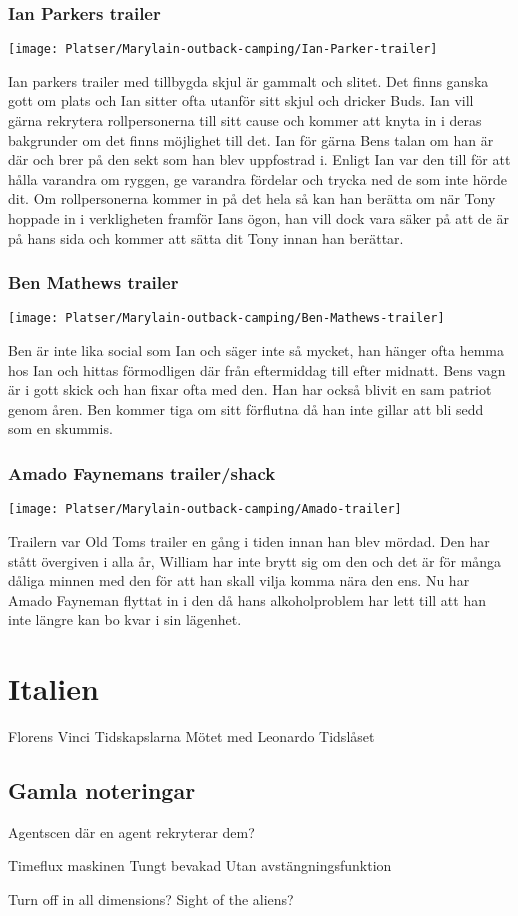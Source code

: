 \documentclass[a5paper,10pt]{report}
\begin{document}
\subsection{Ian Parkers trailer}
\texttt{[image: Platser/Marylain-outback-camping/Ian-Parker-trailer]}

Ian parkers trailer med tillbygda skjul är gammalt och slitet. Det finns ganska gott om plats och Ian sitter ofta utanför sitt skjul och dricker Buds. Ian vill gärna rekrytera rollpersonerna till sitt cause och kommer att knyta in i deras bakgrunder om det finns möjlighet till det. Ian för gärna Bens talan om han är där och brer på den sekt som han blev uppfostrad i. Enligt Ian var den till för att hålla varandra om ryggen, ge varandra fördelar och trycka ned de som inte hörde dit. Om rollpersonerna kommer in på det hela så kan han berätta om när Tony hoppade in i verkligheten framför Ians ögon, han vill dock vara säker på att de är på hans sida och kommer att sätta dit Tony innan han berättar.
\clearpage
\subsection{Ben Mathews trailer}
\texttt{[image: Platser/Marylain-outback-camping/Ben-Mathews-trailer]}

Ben är inte lika social som Ian och säger inte så mycket, han hänger ofta hemma hos Ian och hittas förmodligen där från eftermiddag till efter midnatt. Bens vagn är i gott skick och han fixar ofta med den. Han har också blivit en sam patriot genom åren. Ben kommer tiga om sitt förflutna då han inte gillar att bli sedd som en skummis.
\clearpage
\subsection{Amado Faynemans trailer/shack}
\texttt{[image: Platser/Marylain-outback-camping/Amado-trailer]}

Trailern var Old Toms trailer en gång i tiden innan han blev mördad. Den har stått övergiven i alla år, William har inte brytt sig om den och det är för många dåliga minnen med den för att han skall vilja komma nära den ens. Nu har Amado Fayneman flyttat in i den då hans alkoholproblem har lett till att han inte längre kan bo kvar i sin lägenhet.
\chapter{Italien}
Florens
Vinci
Tidskapslarna
Mötet med Leonardo
Tidslåset
\clearpage
\section{Gamla noteringar}

Agentscen där en agent rekryterar dem?

Timeflux maskinen
  Tungt bevakad
  Utan avstängningsfunktion

Turn off in all dimensions?
  Sight of the aliens?
\end{document}
